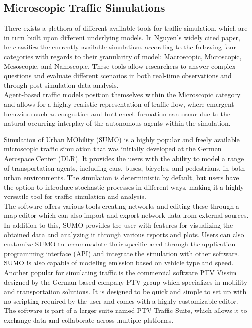 \subsection{Microscopic Traffic Simulations}
There exists a plethora of different available tools for traffic simulation, which are in turn built upon different underlying models. In Nguyen’s widely cited paper, he classifies the currently available simulations according to the following four categories with regards to their granularity of model: Macroscopic, Microscopic, Mesoscopic, and Nanoscopic. These tools allow researchers to answer complex questions and evaluate different scenarios in both real-time observations and through post-simulation data analysis. \\

Agent-based traffic models position themselves within the Microscopic category and allows for a highly realistic representation of traffic flow, where emergent behaviors such as congestion and bottleneck formation can occur due to the natural occurring interplay of the autonomous agents within the simulation. 

Simulation of Urban MObility (SUMO) is a highly popular and freely available microscopic traffic simulation that was initially developed at the German Aerospace Center (DLR). It provides the users with the ability to model a range of transportation agents, including cars, buses, bicycles, and pedestrians, in both urban environments. The simulation is deterministic by default, but users have the option to introduce stochastic processes in different ways, making it a highly versatile tool for traffic simulation and analysis.\\

The software offers various tools creating networks and editing these through a map editor which can also import and export network data from external sources. In addition to this, SUMO provides the user with features for visualizing the obtained data and analyzing it through various reports and plots. Users can also customize SUMO to accommodate their specific need through the application programming interface (API) and integrate the simulation with other software. SUMO is also capable of modeling emission based on vehicle type and speed. \\

Another popular for simulating traffic is the commercial software PTV Vissim designed by the German-based company PTV group which specializes in mobility and transportation solutions. It is designed to be quick and simple to set up with no scripting required by the user and comes with a highly customizable editor. The software is part of a larger suite named PTV Traffic Suite, which allows it to exchange data and collaborate across multiple platforms. \\

